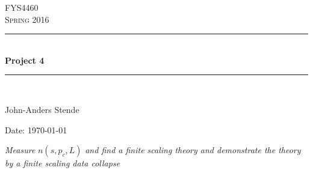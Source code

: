 \documentclass[english, a4paper]{article}
\begin{document}
\renewcommand{\figurename}{Figure}
\begin{titlepage}
\begin{center}

\textsc{\Large FYS4460}\\[0.5cm]
\textsc{\Large Spring 2016}\\[1.5cm]
\rule{\linewidth}{0.5mm} \\[0.4cm]
{ \huge \bfseries Project 4}\\[0.10cm]
\rule{\linewidth}{0.5mm} \\[1.5cm]

\begin{minipage}{0.49\textwidth}
    \begin{center} \large
        John-Anders Stende \\[0.8cm]
    \end{center}
\end{minipage}


\vfill

\large{Date: \today}

\end{center}
\end{titlepage}


\textit{Measure} $n(s,p_c,L)$ \textit{and find a finite scaling theory and demonstrate the theory by a finite
scaling data collapse} \\
\end{document}
